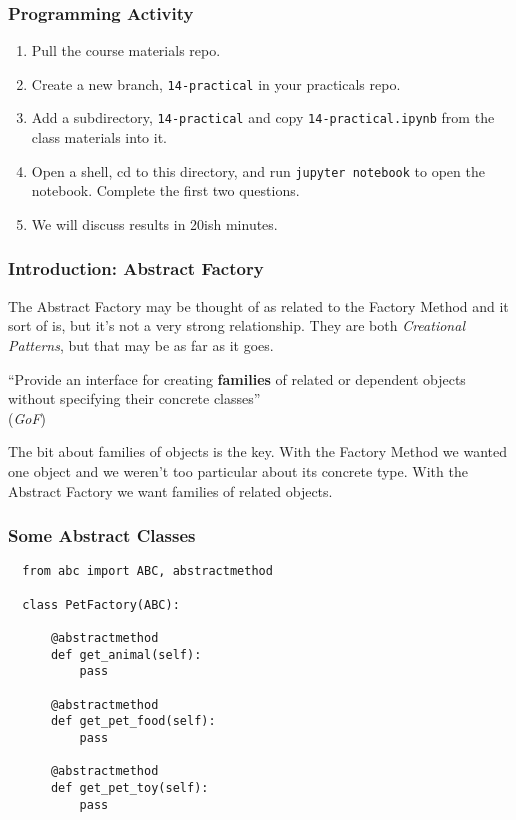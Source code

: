 \documentclass[10pt]{beamer}
\begin{document}
\begin{frame}
  \frametitle{Programming Activity}
  
  \begin{enumerate}
    \item Pull the course materials repo.
    \item Create a new branch, \texttt{14-practical} in your practicals repo.
    \item Add a subdirectory,  \texttt{14-practical} and copy \texttt{14-practical.ipynb} from the class materials into it.
    \item Open a shell, cd to this directory, and run \texttt{jupyter notebook} to open the notebook. Complete the first two questions.
    \item We will discuss results in 20ish minutes.
  \end{enumerate}      
\end{frame}
\begin{frame}[fragile]
  \frametitle{Introduction: Abstract Factory}
  
  The Abstract Factory may be thought of as related to the Factory Method and 
  it sort of is, but it's not a very strong relationship. They are both \emph{Creational
  Patterns}, but that may be as far as it goes.
    
  \vspace{5mm}
  ``Provide an interface for creating \textbf{families} of related or dependent objects without 
  specifying their concrete classes'' \\
  (\emph{GoF})
  
  \vspace{5mm}
  The bit about families of objects is the key. With the Factory Method we wanted one object and we weren't 
  too particular about its concrete type. With the Abstract Factory we want families of related objects.

  
  \end{frame}
  
\begin{frame}[fragile]
  \frametitle{Some Abstract Classes}

  
  \begin{verbatim}
  from abc import ABC, abstractmethod
  
  class PetFactory(ABC):
      
      @abstractmethod
      def get_animal(self):
          pass
        
      @abstractmethod  
      def get_pet_food(self):
          pass
      
      @abstractmethod 
      def get_pet_toy(self):
          pass        
  
  \end{verbatim}
\end{frame}  
\end{document}
